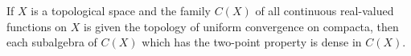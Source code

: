 If $X$ is a topological space and the family $C(X)$ of all continuous real-valued functions on $X$ is given the topology of uniform convergence on compacta, then each subalgebra of $C(X)$ which has the two-point property is dense in $C(X)$.

